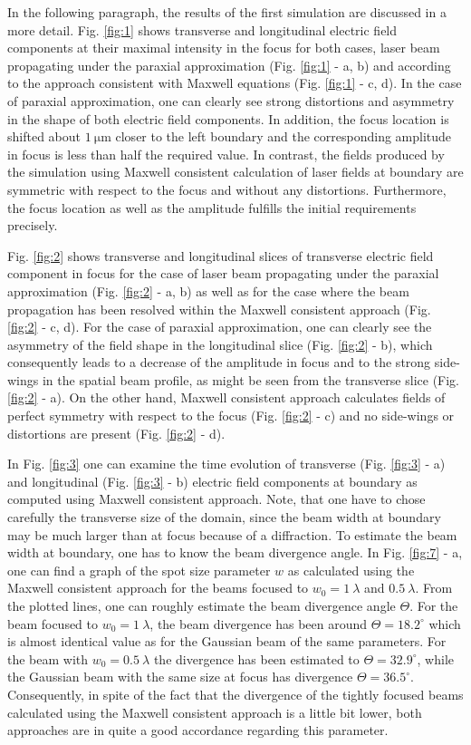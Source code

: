 In the following paragraph, the results of the first simulation are discussed in a more detail. Fig. \ref{fig:1} shows transverse and longitudinal electric field components at their maximal intensity in the focus for both cases, laser beam propagating under the paraxial approximation (Fig. \ref{fig:1} - a, b) and according to the approach consistent with Maxwell equations (Fig. \ref{fig:1} - c, d). In the case of paraxial approximation, one can clearly see strong distortions and asymmetry in the shape of both electric field components. In addition, the focus location is shifted about $ 1 \: \mathrm{\mu m} $ closer to the left boundary and the corresponding amplitude in focus is less than half the required value. In contrast, the fields produced by the simulation using Maxwell consistent calculation of laser fields at boundary are symmetric with respect to the focus and without any distortions. Furthermore, the focus location as well as the amplitude fulfills the initial requirements precisely.

Fig. \ref{fig:2} shows transverse and longitudinal slices of transverse electric field component in focus for the case of laser beam propagating under the paraxial approximation (Fig. \ref{fig:2} - a, b) as well as for the case where the beam propagation has been resolved within the Maxwell consistent approach (Fig. \ref{fig:2} - c, d). For the case of paraxial approximation, one can clearly see the asymmetry of the field shape in the longitudinal slice (Fig. \ref{fig:2} - b), which consequently leads to a decrease of the amplitude in focus and to the strong side-wings in the spatial beam profile, as might be seen from the transverse slice (Fig. \ref{fig:2} - a). On the other hand, Maxwell consistent approach calculates fields of perfect symmetry with respect to the focus (Fig. \ref{fig:2} - c) and no side-wings or distortions are present (Fig. \ref{fig:2} - d).

In Fig. \ref{fig:3} one can examine the time evolution of transverse (Fig. \ref{fig:3} - a) and longitudinal (Fig. \ref{fig:3} - b) electric field components at boundary as computed using Maxwell consistent approach. Note, that one have to chose carefully the transverse size of the domain, since the beam width at boundary may be much larger than at focus because of a diffraction. To estimate the beam width at boundary, one has to know the beam divergence angle. In Fig. \ref{fig:7} - a, one can find a graph of the spot size parameter $ w $ as calculated using the Maxwell consistent approach for the beams focused to $ w_0 = 1 \: \lambda $ and $ 0.5 \: \lambda $. From the plotted lines, one can roughly estimate the beam divergence angle $ \Theta $. For the beam focused to $ w_0 = 1 \: \lambda $, the beam divergence has been around $ \Theta = 18.2 ^{\circ} $ which is almost identical value as for the Gaussian beam of the same parameters. For the beam with $ w_0 = 0.5 \: \lambda $ the divergence has been estimated to $ \Theta = 32.9 ^{\circ} $, while the Gaussian beam with the same size at focus has divergence $ \Theta = 36.5 ^{\circ} $. Consequently, in spite of the fact that the divergence of the tightly focused beams calculated using the Maxwell consistent approach is a little bit lower, both approaches are in quite a good accordance regarding this parameter.


